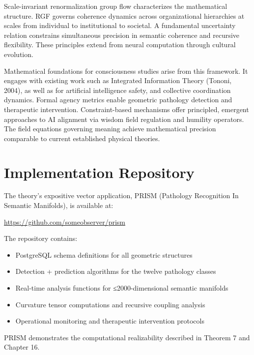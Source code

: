 \documentclass[11pt, a4paper]{report}
\begin{document}
Scale-invariant renormalization group flow characterizes the mathematical structure. RGF governs coherence dynamics across organizational hierarchies at scales from individual to institutional to societal. A fundamental uncertainty relation constrains simultaneous precision in semantic coherence and recursive flexibility. These principles extend from neural computation through cultural evolution.

Mathematical foundations for consciousness studies arise from this framework. It engages with existing work such as Integrated Information Theory (Tononi, 2004), as well as for artificial intelligence safety, and collective coordination dynamics. Formal agency metrics enable geometric pathology detection and therapeutic intervention. Constraint-based mechanisms offer principled, emergent approaches to AI alignment via wisdom field regulation and humility operators. The field equations governing meaning achieve mathematical precision comparable to current established physical theories.

\tableofcontents

















\appendix
\chapter{Implementation Repository}
\label{appendix:implementation}

The theory's expositive vector application, PRISM (Pathology Recognition In Semantic Manifolds), is available at:

\begin{center}
\url{https://github.com/someobserver/prism}
\end{center}

The repository contains:
\begin{itemize}
\item PostgreSQL schema definitions for all geometric structures
\item Detection + prediction algorithms for the twelve pathology classes
\item Real-time analysis functions for ≤2000-dimensional semantic manifolds
\item Curvature tensor computations and recursive coupling analysis
\item Operational monitoring and therapeutic intervention protocols
\end{itemize}

PRISM demonstrates the computational realizability described in Theorem 7 and Chapter 16.

\printbibliography
\end{document}

